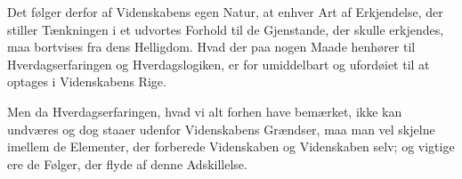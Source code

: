 \documentclass[12pt]{book}
\begin{document}
Det følger derfor af Videnskabens egen Natur, at enhver Art af
Erkjendelse, der stiller Tænkningen i et udvortes Forhold til de
Gjenstande, der skulle erkjendes, maa bortvises fra dens Helligdom.
Hvad der paa nogen Maade henhører til Hverdagserfaringen og
Hverdagslogiken, er for umiddelbart og ufordøiet til at optages i
Videnskabens Rige.

Men da Hverdagserfaringen, hvad vi alt forhen have bemærket, ikke kan
undværes og dog staaer udenfor Videnskabens Grændser, maa man vel
skjelne imellem de Elementer, der forberede Videnskaben og
Videnskaben selv; og vigtige ere de Følger, der flyde af denne
Adskillelse.
\end{document}
